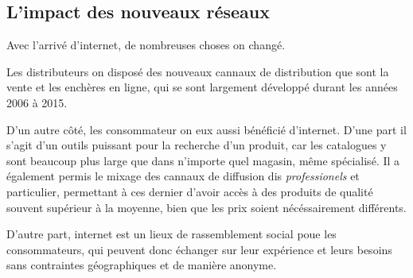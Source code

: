 \subsection{L'impact des nouveaux réseaux}

Avec l'arrivé d'internet, de nombreuses choses on changé.

\medbreak
Les distributeurs on disposé des nouveaux cannaux de distribution que sont la vente et les enchères en ligne, qui se sont largement développé durant les années 2006 à 2015.

\medbreak
D'un autre côté, les consommateur on eux aussi bénéficié d'internet.
\smallbreak
D'une part il s'agit d'un outils puissant pour la recherche d'un produit, car les catalogues y sont beaucoup plus large que dans n'importe quel magasin, même spécialisé. Il a également permis le mixage des cannaux de diffusion dis \textit{professionels} et {particulier}, permettant à ces dernier d'avoir accès à des produits de qualité souvent supérieur à la moyenne, bien que les prix soient nécéssairement différents.

D'autre part, internet est un lieux de rassemblement social poue les consommateurs, qui peuvent donc échanger sur leur expérience et leurs besoins sans contraintes géographiques et de manière anonyme.
